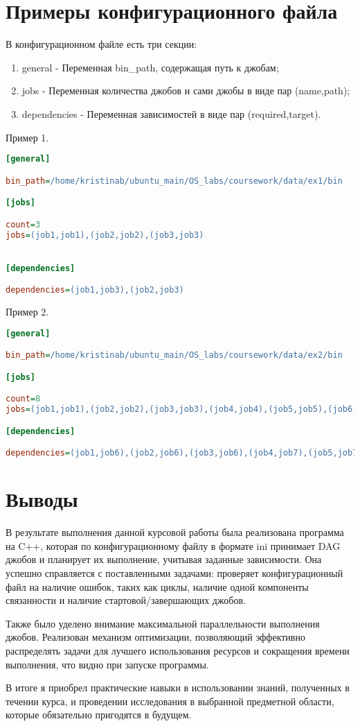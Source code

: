 \documentclass[a4paper, 12pt]{article}
\begin{document}
\newpage
\section{Примеры конфигурационного файла}
В конфигурационном файле есть три секции:
\begin{enumerate}
    \item general - Переменная bin\_path, содержащая путь к джобам;
    \item jobs - Переменная количества джобов и сами джобы в виде пар (name,path);
    \item dependencies - Переменная зависимостей в виде пар (required,target).
\end{enumerate}

Пример 1.
\begin{lstlisting}[language=ini]
[general]

bin_path=/home/kristinab/ubuntu_main/OS_labs/coursework/data/ex1/bin

[jobs]

count=3
jobs=(job1,job1),(job2,job2),(job3,job3)


[dependencies]

dependencies=(job1,job3),(job2,job3)
\end{lstlisting}

Пример 2.
\begin{lstlisting}[language=ini]
[general]

bin_path=/home/kristinab/ubuntu_main/OS_labs/coursework/data/ex2/bin

[jobs]

count=8
jobs=(job1,job1),(job2,job2),(job3,job3),(job4,job4),(job5,job5),(job6,job6),(job7,job7),(job8,job8)

[dependencies]

dependencies=(job1,job6),(job2,job6),(job3,job6),(job4,job7),(job5,job7),(job6,job8),(job7,job8)
\end{lstlisting}

\newpage

\section{Выводы}

В результате выполнения данной курсовой работы была реализована программа на C++, которая по конфигурационному файлу в формате ini принимает DAG джобов и планирует их выполнение, учитывая заданные зависимости. Она успешно справляется с поставленными задачами: проверяет конфигурационный файл на наличие ошибок, таких как циклы, наличие одной компоненты связанности и наличие стартовой/завершающих джобов. 

Также было уделено внимание максимальной параллельности выполнения джобов. Реализован механизм оптимизации, позволяющий эффективно распределять задачи для лучшего использования ресурсов и сокращения времени выполнения, что видно при запуске программы.

В итоге я приобрел практические навыки в использовании знаний, полученных в течении курса, и проведении исследования в выбранной предметной области, которые обязательно пригодятся в будущем.
\end{document}
